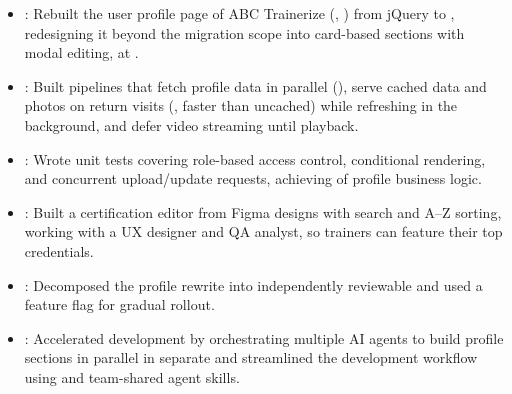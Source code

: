 \begin{itemize}
  \item {}: Rebuilt the user profile page of ABC Trainerize (, ) from jQuery to , redesigning it beyond the migration scope into card-based sections with modal editing, at .
  \item {}: Built  pipelines that fetch profile data in parallel (), serve cached data and photos on return visits (, \resumeEmphasis{2.4\ensuremath{\times}} faster than uncached) while refreshing in the background, and defer video streaming until playback.
  \item {}: Wrote  unit tests covering role-based access control, conditional rendering, and concurrent upload/update requests, achieving  of profile business logic.
  \item {}: Built a  certification editor from Figma designs with search and A--Z sorting, working with a UX designer and QA analyst, so trainers can feature their top credentials.
  \item {}: Decomposed the profile rewrite into independently reviewable  and used a  feature flag for gradual rollout.
  \item {}: Accelerated development by orchestrating multiple AI agents to build profile sections in parallel in separate  and streamlined the development workflow using  and team-shared agent skills.
\end{itemize}

